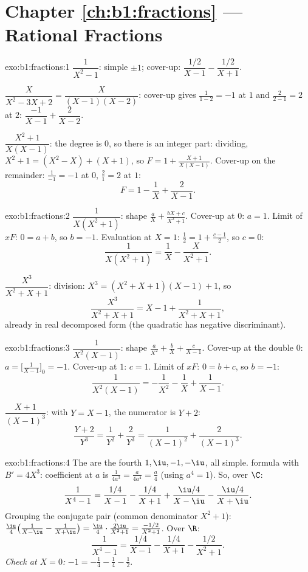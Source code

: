 \section*{Chapter \ref{ch:b1:fractions} --- Rational Fractions}

\begin{solution}{exo:b1:fractions:1}
$\dfrac{1}{X^2 - 1}$: simple  $\pm 1$; cover-up:
$\dfrac{1/2}{X-1} - \dfrac{1/2}{X+1}$.

$\dfrac{X}{X^2 - 3X + 2} = \dfrac{X}{(X-1)(X-2)}$: cover-up gives
$\frac{1}{1-2} = -1$ at $1$ and $\frac{2}{2-1} = 2$ at $2$:
$\dfrac{-1}{X-1} + \dfrac{2}{X-2}$.

$\dfrac{X^2+1}{X(X-1)}$: the degree is $0$, so there is an integer
part: dividing, $X^2 + 1 = (X^2 - X) + (X + 1)$, so $F = 1 +
\frac{X+1}{X(X-1)}$. Cover-up on the remainder: $\frac{1}{-1} = -1$
at $0$, $\frac{2}{1} = 2$ at $1$:
\[
F = 1 - \frac{1}{X} + \frac{2}{X-1} .
\]
\end{solution}

\begin{solution}{exo:b1:fractions:2}
$\dfrac{1}{X(X^2+1)}$: shape $\frac aX + \frac{bX + c}{X^2 + 1}$.
Cover-up at $0$: $a = 1$. Limit of $xF$: $0 = a + b$, so $b = -1$.
Evaluation at $X = 1$: $\frac12 = 1 + \frac{c - 1}{2}$, so $c = 0$:
\[
\frac{1}{X(X^2+1)} = \frac 1X - \frac{X}{X^2+1} .
\]

$\dfrac{X^3}{X^2+X+1}$: division: $X^3 = (X^2+X+1)(X - 1) + 1$, so
\[
\frac{X^3}{X^2+X+1} = X - 1 + \frac{1}{X^2 + X + 1} ,
\]
already in real decomposed form (the quadratic has negative
discriminant).
\end{solution}

\begin{solution}{exo:b1:fractions:3}
$\dfrac{1}{X^2(X-1)}$: shape $\frac{a}{X^2} + \frac bX +
\frac{c}{X-1}$. Cover-up at the double  $0$:
$a = \bigl[\frac{1}{X-1}\bigr]_{0} = -1$. Cover-up at $1$: $c = 1$.
Limit of $xF$: $0 = b + c$, so $b = -1$:
\[
\frac{1}{X^2(X-1)} = -\frac{1}{X^2} - \frac1X + \frac{1}{X-1} .
\]

$\dfrac{X+1}{(X-1)^3}$: with $Y = X - 1$, the numerator is $Y + 2$:
\[
\frac{Y + 2}{Y^3} = \frac{1}{Y^2} + \frac{2}{Y^3}
= \frac{1}{(X-1)^2} + \frac{2}{(X-1)^3} .
\]
\end{solution}

\begin{solution}{exo:b1:fractions:4}
The  are the fourth  $1, \iu, -1, -\iu$, all
simple.  formula with $B' = 4X^3$: coefficient at $a$ is
$\frac{1}{4a^3} = \frac{a}{4a^4} = \frac a4$ (using $a^4 = 1$). So,
over $\C$:
\[
\frac{1}{X^4 - 1}
= \frac{1/4}{X - 1} - \frac{1/4}{X + 1}
+ \frac{\iu/4}{X - \iu} - \frac{\iu/4}{X + \iu} .
\]
Grouping the conjugate pair (common denominator $X^2 + 1$):
$\frac{\iu}{4}\bigl(\frac{1}{X-\iu} - \frac{1}{X+\iu}\bigr) =
\frac{\iu}{4}\cdot\frac{2\iu}{X^2+1} = \frac{-1/2}{X^2+1}$. Over
$\R$:
\[
\frac{1}{X^4 - 1}
= \frac{1/4}{X-1} - \frac{1/4}{X+1} - \frac{1/2}{X^2 + 1} .
\]
\emph{Check at $X = 0$:} $-1 = -\frac14 - \frac14 - \frac12$.
\end{solution}

